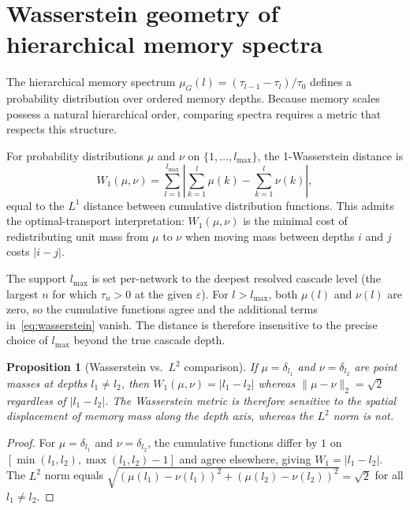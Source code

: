 \documentclass[aps,superscriptaddress,11pt]{revtex4-2}
\newtheorem{proposition}[theorem]{Proposition}
\theoremstyle{definition}
\theoremstyle{plain}
\begin{document}
\section{Wasserstein geometry of hierarchical memory spectra}
\label{sec:wasserstein}

The hierarchical memory spectrum $\mu_G(l) = (\tau_{l-1}-\tau_l)/\tau_0$
defines a probability distribution over ordered memory depths. Because
memory scales possess a natural hierarchical order, comparing spectra
requires a metric that respects this structure.

For probability distributions $\mu$ and $\nu$ on $\{1,\ldots,l_{\max}\}$,
the 1-Wasserstein distance is
\begin{equation}
  W_1(\mu,\nu)
  = \sum_{l=1}^{l_{\max}}
    \left|\sum_{k=1}^{l}\mu(k) - \sum_{k=1}^{l}\nu(k)\right|,
  \label{eq:wasserstein}
\end{equation}
equal to the $L^1$ distance between cumulative distribution functions. This
admits the optimal-transport interpretation: $W_1(\mu,\nu)$ is the minimal
cost of redistributing unit mass from $\mu$ to $\nu$ when moving mass
between depths $i$ and $j$ costs $|i-j|$.

The support $l_{\max}$ is set per-network to the deepest resolved cascade
level (the largest $n$ for which $\tau_n>0$ at the given $\varepsilon$).
For $l>l_{\max}$, both $\mu(l)$ and $\nu(l)$ are zero, so the cumulative
functions agree and the additional terms in~\eqref{eq:wasserstein} vanish.
The distance is therefore insensitive to the precise choice of $l_{\max}$
beyond the true cascade depth.

\begin{proposition}[Wasserstein vs.\ $L^2$ comparison]
\label{prop:w1_l2}
If $\mu=\delta_{l_1}$ and $\nu=\delta_{l_2}$ are point masses at depths
$l_1\neq l_2$, then $W_1(\mu,\nu)=|l_1-l_2|$ whereas
$\|\mu-\nu\|_2=\sqrt{2}$ regardless of $|l_1-l_2|$. The Wasserstein
metric is therefore sensitive to the spatial displacement of memory mass
along the depth axis, whereas the $L^2$ norm is not.
\end{proposition}

\begin{proof}
For $\mu=\delta_{l_1}$ and $\nu=\delta_{l_2}$, the cumulative functions
differ by $1$ on $[\min(l_1,l_2),\max(l_1,l_2)-1]$ and agree elsewhere,
giving $W_1=|l_1-l_2|$. The $L^2$ norm equals
$\sqrt{(\mu(l_1)-\nu(l_1))^2+(\mu(l_2)-\nu(l_2))^2}=\sqrt{2}$ for all
$l_1\neq l_2$.
\end{proof}
\end{document}
